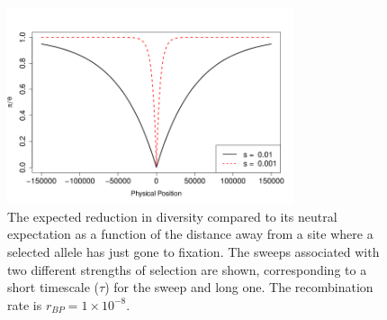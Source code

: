 \begin{figure}
\begin{center}
\includegraphics[width=0.75\textwidth]{figures/hitchhiking_reduction.png}
\end{center}
\caption{The expected reduction in diversity compared to its neutral expectation as
a function of the distance away from a site where a selected allele
has just gone to fixation. The sweeps associated with two different strengths of selection are shown, corresponding to a short timescale ($\tau$) for the sweep and long one. The recombination rate is $r_{BP}= 1\times
10^{-8}$. } \label{fig:hitchhiking_reduction}
\end{figure}




